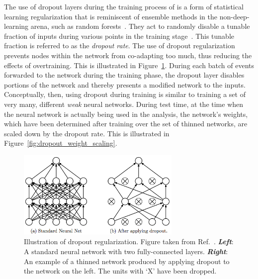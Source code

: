 The use of dropout layers during the training process of is a form of statistical learning regularization that is reminiscent
of ensemble methods in the non-deep-learning arena, such as random forests~\cite{RandomForestsBreiman2001}.
They act to randomly disable a tunable fraction of inputs during various points in the training stage~\cite{JMLRDropout}.
This tunable fraction is referred to as the \textit{dropout rate}.
The use of dropout regularization prevents nodes within the network from co-adapting too much, thus reducing
the effects of overtraining.
This is illustrated in Figure~\ref{fig:dropout_illustration}.
During each batch of events forwarded to the network during the training phase, the dropout layer disables
portions of the network and thereby presents a modified network to the inputs.
Conceptually, then, using dropout during training is similar to training a set of very many, different \textit{weak}
neural networks.
During test time, at the time when the neural network is actually being used in the analysis,
the network's weights, which have been determined after training over the set of thinned networks,
are scaled down by the dropout rate.
This is illustrated in Figure~\ref{fig:dropout_weight_scaling}.

\begin{figure}[!htb]
    \begin{center}
        \includegraphics[width=0.7\textwidth]{figures/search_hh/mva/dropout_illustration}
        \caption{
            Illustration of dropout regularization. Figure taken from Ref.~\cite{JMLRDropout}.
            \textit{\textbf{Left}}: A standard neural network with two fully-connected layers.
            \textit{\textbf{Right}}: An example of a thinned network produced by applying dropout to the
                network on the left.
                The units with `X' have been dropped.
        }
        \label{fig:dropout_illustration}
    \end{center}
\end{figure}


